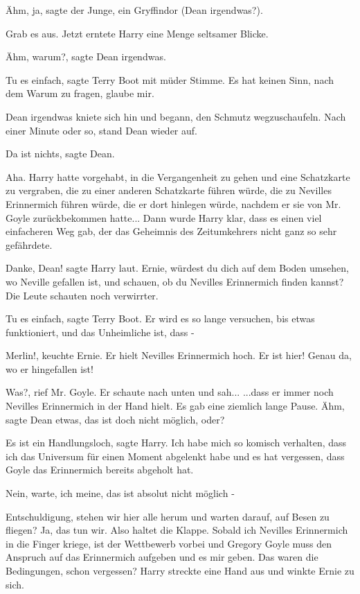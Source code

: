 \glqq Ähm, ja\grqq{}, sagte der Junge, ein Gryffindor (Dean irgendwas?).

\glqq Grab es aus.\grqq{} Jetzt erntete Harry eine Menge seltsamer Blicke.

\glqq Ähm, warum?\grqq{}, sagte Dean irgendwas.

\glqq Tu es einfach\grqq{}, sagte Terry Boot mit müder Stimme. \glqq Es hat
keinen Sinn, nach dem Warum zu fragen, glaube mir.\grqq{}

Dean irgendwas kniete sich hin und begann, den Schmutz wegzuschaufeln. Nach
einer Minute oder so, stand Dean wieder auf.

\glqq Da ist nichts\grqq{}, sagte Dean.

Aha. Harry hatte vorgehabt, in die Vergangenheit zu gehen und eine Schatzkarte
zu vergraben, die zu einer anderen Schatzkarte führen würde, die zu Nevilles
Erinnermich führen würde, die er dort hinlegen würde, nachdem er sie von Mr.
Goyle zurückbekommen hatte... Dann wurde Harry klar, dass es einen viel
einfacheren Weg gab, der das Geheimnis des Zeitumkehrers nicht ganz so sehr
gefährdete.

\glqq Danke, Dean!\grqq{} sagte Harry laut. \glqq Ernie, würdest du dich auf dem
Boden umsehen, wo Neville gefallen ist, und schauen, ob du Nevilles Erinnermich
finden kannst?\grqq{} Die Leute schauten noch verwirrter.

\glqq Tu es einfach\grqq{}, sagte Terry Boot. \glqq Er wird es so lange
versuchen, bis etwas funktioniert, und das Unheimliche ist, dass -\grqq{}

\glqq Merlin!\grqq{}, keuchte Ernie. Er hielt Nevilles Erinnermich hoch. \glqq
Er ist hier! Genau da, wo er hingefallen ist!\grqq{}

\glqq Was?\grqq{}, rief Mr. Goyle. Er schaute nach unten und sah... ...dass er
immer noch Nevilles Erinnermich in der Hand hielt. Es gab eine ziemlich lange
Pause. \glqq Ähm\grqq{}, sagte Dean etwas, \glqq das ist doch nicht möglich,
oder?\grqq{}

\glqq Es ist ein Handlungsloch\grqq{}, sagte Harry. \glqq Ich habe mich so
komisch verhalten, dass ich das Universum für einen Moment abgelenkt habe und es
hat vergessen, dass Goyle das Erinnermich bereits abgeholt hat.\grqq{}

\glqq Nein, warte, ich meine, das ist absolut nicht möglich -\grqq{}

\glqq Entschuldigung, stehen wir hier alle herum und warten darauf, auf Besen zu
fliegen? Ja, das tun wir. Also haltet die Klappe. Sobald ich Nevilles
Erinnermich in die Finger kriege, ist der Wettbewerb vorbei und Gregory Goyle
muss den Anspruch auf das Erinnermich aufgeben und es mir geben. Das waren die
Bedingungen, schon vergessen?\grqq{} Harry streckte eine Hand aus und winkte
Ernie zu sich.

